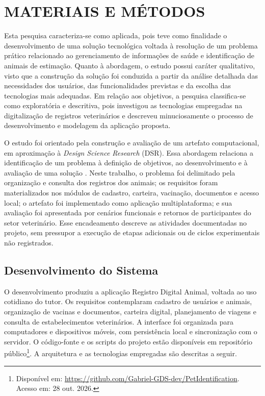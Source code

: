 \documentclass{UNESC}
\begin{document}
\section{MATERIAIS E MÉTODOS}

Esta pesquisa caracteriza-se como aplicada, pois teve como finalidade o desenvolvimento de uma solução tecnológica voltada à resolução de um problema prático relacionado ao gerenciamento de informações de saúde e identificação de animais de estimação. Quanto à abordagem, o estudo possui caráter qualitativo, visto que a construção da solução foi conduzida a partir da análise detalhada das necessidades dos usuários, das funcionalidades previstas e da escolha das tecnologias mais adequadas. Em relação aos objetivos, a pesquisa classifica-se como exploratória e descritiva, pois investigou as tecnologias empregadas na digitalização de registros veterinários e descreveu minuciosamente o processo de desenvolvimento e modelagem da aplicação proposta.

O estudo foi orientado pela construção e avaliação de um artefato computacional, em aproximação à \textit{Design Science Research} (DSR). Essa abordagem relaciona a identificação de um problema à definição de objetivos, ao desenvolvimento e à avaliação de uma solução \cite{peffers2007}. Neste trabalho, o problema foi delimitado pela organização e consulta dos registros dos animais; os requisitos foram materializados nos módulos de cadastro, carteira, vacinação, documentos e acesso local; o artefato foi implementado como aplicação multiplataforma; e sua avaliação foi apresentada por cenários funcionais e retornos de participantes do setor veterinário. Esse encadeamento descreve as atividades documentadas no projeto, sem pressupor a execução de etapas adicionais ou de ciclos experimentais não registrados.

\subsection{Desenvolvimento do Sistema}

O desenvolvimento produziu a aplicação Registro Digital Animal, voltada ao uso cotidiano do tutor. Os requisitos contemplaram cadastro de usuários e animais, organização de vacinas e documentos, carteira digital, planejamento de viagens e consulta de estabelecimentos veterinários. A interface foi organizada para computadores e dispositivos móveis, com persistência local e sincronização com o servidor. O código-fonte e os scripts do projeto estão disponíveis em repositório público\footnote{Disponível em: \url{https://github.com/Gabriel-GDS-dev/PetIdentification}. Acesso em: 28 out. 2026.}. A arquitetura e as tecnologias empregadas são descritas a seguir.
\end{document}
